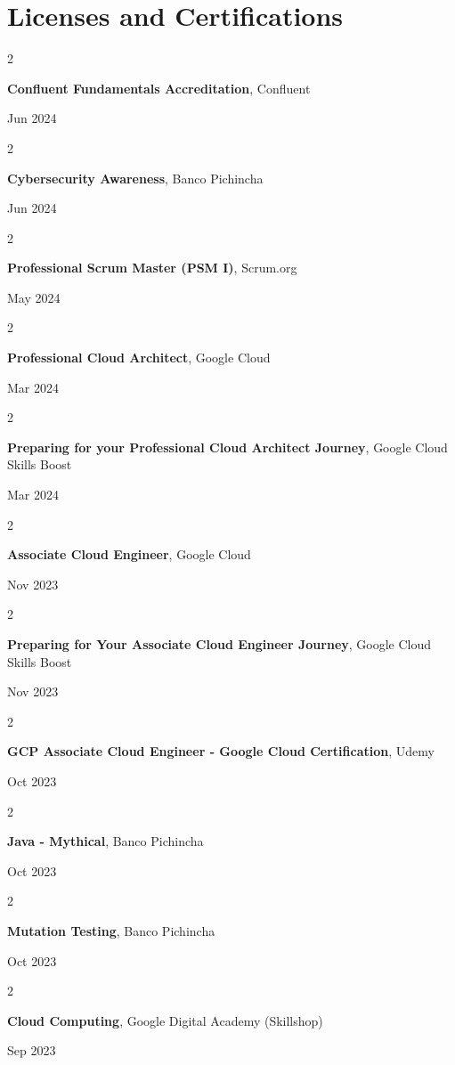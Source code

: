 \documentclass[10pt, letterpaper]{article}
\newenvironment{twocolentry}[2][]{
    \onecolentry
    \def\secondColumn{#2}
    \setcolumnwidth{\fill, 4.5 cm}
    \begin{paracol}{2}
}{
    \switchcolumn \raggedleft \secondColumn
    \end{paracol}
    \endonecolentry
} %
\begin{document}
    \section{Licenses and Certifications}    
    \begin{twocolentry}{
            Jun 2024
        }
        \textbf{Confluent Fundamentals Accreditation}, Confluent
    \end{twocolentry}
    \begin{twocolentry}{
            Jun 2024
        }
        \textbf{Cybersecurity Awareness}, Banco Pichincha
    \end{twocolentry}
    \begin{twocolentry}{
            May 2024
        }
        \textbf{Professional Scrum Master (PSM I)}, Scrum.org
    \end{twocolentry}
    \begin{twocolentry}{
            Mar 2024
        }
        \textbf{Professional Cloud Architect}, Google Cloud
    \end{twocolentry}
    \begin{twocolentry}{
            Mar 2024
        }
        \textbf{Preparing for your Professional Cloud Architect Journey}, Google Cloud Skills Boost
    \end{twocolentry}
    \begin{twocolentry}{
            Nov 2023
        }
        \textbf{Associate Cloud Engineer}, Google Cloud
    \end{twocolentry}
    \begin{twocolentry}{
            Nov 2023
        }
        \textbf{Preparing for Your Associate Cloud Engineer Journey}, Google Cloud Skills Boost
    \end{twocolentry}
    \begin{twocolentry}{
            Oct 2023
        }
        \textbf{GCP Associate Cloud Engineer - Google Cloud Certification}, Udemy
    \end{twocolentry}
    \begin{twocolentry}{
            Oct 2023
        }
        \textbf{Java - Mythical}, Banco Pichincha
    \end{twocolentry}
    \begin{twocolentry}{
            Oct 2023
        }
        \textbf{Mutation Testing}, Banco Pichincha
    \end{twocolentry}
    \begin{twocolentry}{
            Sep 2023
        }
        \textbf{Cloud Computing}, Google Digital Academy (Skillshop)
    \end{twocolentry}
\end{document}
